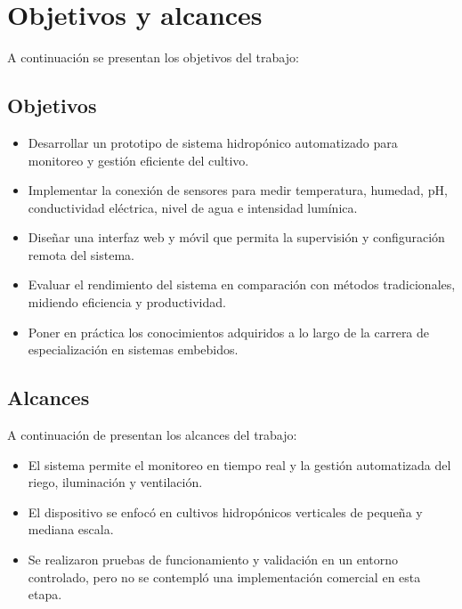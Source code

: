 


\section{Objetivos y alcances}

A continuación se presentan los objetivos del trabajo:

\subsection{Objetivos}
\begin{itemize}
    \item Desarrollar un prototipo de sistema hidropónico automatizado para monitoreo y gestión eficiente del cultivo.
    \item Implementar la conexión de sensores para medir temperatura, humedad, pH, conductividad eléctrica, nivel de agua e intensidad lumínica.
    \item Diseñar una interfaz web y móvil que permita la supervisión y configuración remota del sistema.
    \item Evaluar el rendimiento del sistema en comparación con métodos tradicionales, midiendo eficiencia y productividad.
    \item Poner en práctica los conocimientos adquiridos a lo largo de la carrera de especialización en sistemas embebidos.
\end{itemize}

\subsection{Alcances}

A continuación de presentan los alcances del trabajo:

\begin{itemize}
    \item El sistema permite el monitoreo en tiempo real y la gestión automatizada del riego, iluminación y ventilación.
    \item El dispositivo se enfocó en cultivos hidropónicos verticales de pequeña y mediana escala.
    \item Se realizaron pruebas de funcionamiento y validación en un entorno controlado, pero no se contempló una implementación comercial en esta etapa.
\end{itemize}

